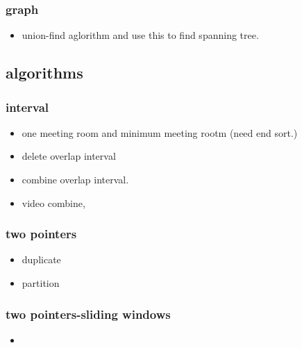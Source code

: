 \documentclass[a4paper,11pt,twoside]{book}
\begin{document}
\subsubsection{graph}

\begin{itemize}
	\item union-find aglorithm and use this to find spanning tree.
	
\end{itemize}

\subsection{algorithms}
\subsubsection{interval}
\begin{itemize}
	\item one meeting room and minimum meeting rootm (need end sort.)
	\item delete overlap interval
	\item combine overlap interval.
	\item video combine, 
	
\end{itemize}

\subsubsection{two pointers}
\begin{itemize}
	\item duplicate
	\item partition
\end{itemize}

\subsubsection{two pointers-sliding windows}
\begin{itemize}
	\item 
\end{itemize}
\end{document}

